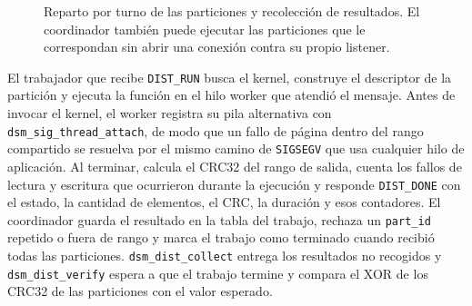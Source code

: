 \documentclass[11pt,spanish]{article}
\begin{document}
\begin{figure}[H]
\centering
{}
\caption{Reparto por turno de las particiones y recolección de resultados. El coordinador también puede ejecutar las particiones que le correspondan sin abrir una conexión contra su propio listener.}
\label{fig:dist}
\end{figure}

El trabajador que recibe \texttt{DIST\_RUN} busca el kernel, construye el descriptor de la partición y ejecuta la función en el hilo worker que atendió el mensaje. Antes de invocar el kernel, el worker registra su pila alternativa con \texttt{dsm\_sig\_thread\_attach}, de modo que un fallo de página dentro del rango compartido se resuelva por el mismo camino de \texttt{SIGSEGV} que usa cualquier hilo de aplicación. Al terminar, calcula el CRC32 del rango de salida, cuenta los fallos de lectura y escritura que ocurrieron durante la ejecución y responde \texttt{DIST\_DONE} con el estado, la cantidad de elementos, el CRC, la duración y esos contadores. El coordinador guarda el resultado en la tabla del trabajo, rechaza un \texttt{part\_id} repetido o fuera de rango y marca el trabajo como terminado cuando recibió todas las particiones. \texttt{dsm\_dist\_collect} entrega los resultados no recogidos y \texttt{dsm\_dist\_verify} espera a que el trabajo termine y compara el XOR de los CRC32 de las particiones con el valor esperado.
\end{document}
